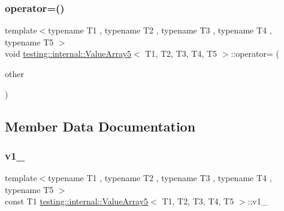 \mbox{\label{classtesting_1_1internal_1_1_value_array5_a26e912217715e21a61351b4091d68487}} 
\subsubsection{\texorpdfstring{operator=()}{operator=()}}
{\footnotesize\ttfamily template$<$typename T1 , typename T2 , typename T3 , typename T4 , typename T5 $>$ \\
void \mbox{\hyperlink{classtesting_1_1internal_1_1_value_array5}{testing\+::internal\+::\+Value\+Array5}}$<$ T1, T2, T3, T4, T5 $>$\+::operator= (\begin{DoxyParamCaption}\item[{const \mbox{\hyperlink{classtesting_1_1internal_1_1_value_array5}{Value\+Array5}}$<$ T1, T2, T3, T4, T5 $>$ \&}]{other }\end{DoxyParamCaption})\hspace{0.3cm}{\ttfamily [private]}}



\subsection{Member Data Documentation}
\mbox{\label{classtesting_1_1internal_1_1_value_array5_ab1e37607826887ea3c6e7dbce3dba56c}} 
\subsubsection{\texorpdfstring{v1\_}{v1\_}}
{\footnotesize\ttfamily template$<$typename T1 , typename T2 , typename T3 , typename T4 , typename T5 $>$ \\
const T1 \mbox{\hyperlink{classtesting_1_1internal_1_1_value_array5}{testing\+::internal\+::\+Value\+Array5}}$<$ T1, T2, T3, T4, T5 $>$\+::v1\+\_\+\hspace{0.3cm}{\ttfamily [private]}}

